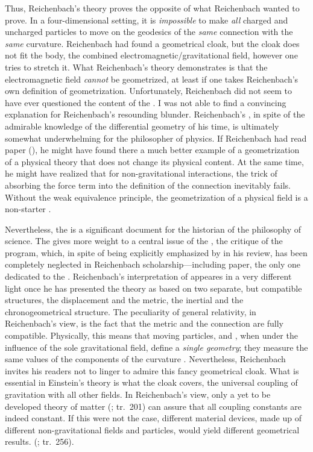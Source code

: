 \documentclass[final]{article}
\newcommand{\PRZL}{\citetitle{Reichenbach1928}\xspace}
\renewcommand{\rzlp}[2]{(\cite[#1]{Reichenbach1928}; tr.\ #2)\xspace}
\begin{document}
Thus, Reichenbach's theory proves the opposite of what Reichenbach wanted to prove. In a four-dimensional setting, it is \emph{impossible} to make \emph{all} charged and uncharged particles to move on the geodesics of the \emph{same} connection with the \emph{same} curvature. Reichenbach had found a geometrical cloak, but the cloak does not fit the body, the combined electromagnetic/gravitational field, however one tries to stretch it. What Reichenbach's theory demonstrates is that the electromagnetic field \emph{cannot} be geometrized, at least if one takes Reichenbach's own definition of geometrization. Unfortunately, Reichenbach did not seem to have ever questioned the content of the \Ap \citep{Einstein1928a,Einstein1929b}. I was not able to find a convincing explanation for Reichenbach's resounding blunder. Reichenbach's \Ap, in spite of the admirable knowledge of the differential geometry of his time, is ultimately somewhat underwhelming for the philosopher of physics. If Reichenbach had read  paper (), he might have found there a much better example of a geometrization of a physical theory that does not change its physical content. At the same time, he might have realized that for non-gravitational interactions, the trick of absorbing the force term into the definition of the connection inevitably fails. Without the weak equivalence principle, the geometrization of a physical field is a non-starter \citep[cf., however,][]{Droz-Vincent1967}.

Nevertheless, the \Ap is a significant document for the historian of the philosophy of science. The \Ap gives more weight to a central issue of the \PRZL, the critique of the  program, which, in spite of being explicitly emphasized by \citet{Einstein1928d} in his review, has been completely neglected in Reichenbach scholarship---including  paper, the only one dedicated to the \Ap. Reichenbach's interpretation of \gr appeares in a very different light once he has presented the theory as based on two separate, but compatible structures, the displacement and the metric, the inertial and the chronogeometrical structure. The peculiarity of general relativity, in Reichenbach's view, is the fact that the metric and the connection are fully compatible. Physically, this means that moving particles, and \rac, when under the influence of the sole gravitational field, define a \emph{single geometry}; they measure the same values of the components of the curvature \rite. Nevertheless, Reichenbach invites his readers not to linger to admire this fancy geometrical cloak. What is essential in Einstein's theory is what the cloak covers, the universal coupling of gravitation with all other fields. In Reichenbach's view, only a yet to be developed theory of matter \rzlp{233}{201} can assure that all coupling constants are indeed constant. If this were not the case, different material devices, made up of different non-gravitational fields and particles, would yield different geometrical results.  \rzlp{295}{256}.
\end{document}
